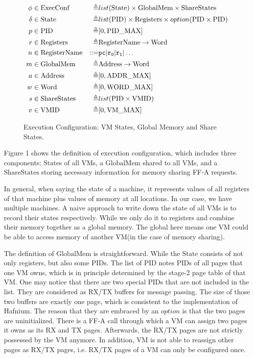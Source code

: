 \documentclass[a4paper]{article} \usepackage[a4paper]{geometry}
\newcommand*{\defined}{\triangleq} \newcommand*{\maps}{\rightarrow}
\newcommand*{\derived}{::=} \newcommand*{\sem}[1]{\llbracket {#1} \rrbracket}
\newcommand*{\CONF}{\text{ExecConf}} \newcommand*{\STATE}{\text{State}}
\newcommand*{\MEM}{\text{GlobalMem}} \newcommand*{\SSS}{\text{ShareStates}}
\newcommand*{\PID}{\text{PID}} \newcommand*{\REGS}{\text{Registers}}
\newcommand*{\ADDR}{\text{Address}} \newcommand*{\WORD}{\text{Word}}
\newcommand*{\VMID}{\text{VMID}} \newcommand*{\REGNAMES}{\text{RegisterName}}
\newcommand*{\PVMMAX}{\text{VM\_MAX}}
\begin{document}
\begin{figure}
  \begin{align*}
    \phi &\in \CONF &\defined &list(\STATE) \times \MEM \times \SSS \\
    \delta &\in \STATE &\defined &list(\PID) \times \REGS \times option(\PID \times \PID) \\
    p & \in \PID &\defined  &[ 0, \PPIDMAX ] \\
    r & \in \REGS &\defined  &\REGNAMES \maps \WORD \\
    n & \in \REGNAMES &\derived  &\mathtt{pc} | \mathtt {r_{0}} | \mathtt{r_{1}} | \dots \\
    m & \in \MEM &\defined  &\ADDR \maps \WORD \\
    a & \in \ADDR &\defined  &[ 0, \PAMAX ] \\
    w & \in \WORD &\defined  &[ 0, \PWMAX ] \\
    s & \in \SSS &\defined  &list(\PID \times \VMID) \\
    v & \in \VMID &\defined  &[ 0, \PVMMAX ]
  \end{align*}
  \caption{Execution Configuration: VM States, Global Memory and Share States.}
\end{figure}
Figure 1 shows the definition of execution configuration, which includes three
components: $\STATE$s of all VMs, a $\MEM$ shared to all VMs, and a $\SSS$
storing necessary information for memory sharing FF-A requests.

In general, when saying the state of a machine, it represents values of all
registers of that machine plus values of memory at all locations. In our case,
we have multiple machines. A naive approach to write down the state of all VMs
is to record their states respectively. While we only do it to registers and
combine their memory together as a global memory. The global here means one VM
could be able to access memory of another VM(in the case of memory sharing).

The definition of $\MEM$ is straightforward. While the $\STATE$ consists of not
only registers, but also some $\PID$s. The list of $\PID$ notes $\PID$s of all
pages that one VM owns, which is in principle determined by the stage-2 page
table of that VM. One may notice that there are two special $\PID$s that are not
included in the list. They are considered as RX/TX buffers for message passing.
The size of those two buffers are exactly one page, which is consistent to the
implementation of Hafnium. The reason that they are embraced by an $option$ is
that the two pages are uninitialized. There is a FF-A call through which a VM
can assign two pages it owns as its RX and TX pages. Afterwards, the RX/TX pages
are not strictly possessed by the VM anymore. In addition, VM is not able to
reassign other pages as RX/TX pages, i.e. RX/TX pages of a VM can only be
configured once.
\end{document}
